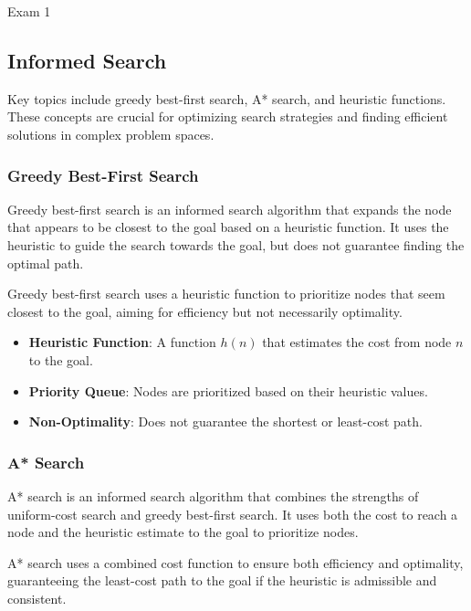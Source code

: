 \begin{examnotes}{Exam 1}
    \subsection*{Informed Search}

    Key topics include greedy best-first search, A* search, and heuristic functions. These concepts are crucial for optimizing search strategies and finding efficient solutions in complex problem spaces.
    
    \subsubsection*{Greedy Best-First Search}
    
    Greedy best-first search is an informed search algorithm that expands the node that appears to be closest to the goal based on a heuristic function. It uses the heuristic to guide the search towards 
    the goal, but does not guarantee finding the optimal path.
    
    \begin{highlight}
        Greedy best-first search uses a heuristic function to prioritize nodes that seem closest to the goal, aiming for efficiency but not necessarily optimality.
        
        \begin{itemize}
            \item \textbf{Heuristic Function}: A function $h(n)$ that estimates the cost from node $n$ to the goal.
            \item \textbf{Priority Queue}: Nodes are prioritized based on their heuristic values.
            \item \textbf{Non-Optimality}: Does not guarantee the shortest or least-cost path.
        \end{itemize}
    \end{highlight}
    
    \subsubsection*{A* Search}
    
    A* search is an informed search algorithm that combines the strengths of uniform-cost search and greedy best-first search. It uses both the cost to reach a node and the heuristic estimate to the 
    goal to prioritize nodes.
    
    \begin{highlight}[A* Search]
        A* search uses a combined cost function to ensure both efficiency and optimality, guaranteeing the least-cost path to the goal if the heuristic is admissible and consistent.
        

\end{highlight}
\end{examnotes}
